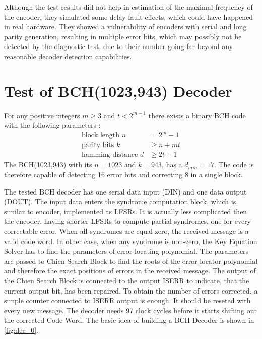 Although the test results did not help in estimation of the maximal frequency of the encoder, they simulated some delay fault effects, which could have happened in real hardware. They showed a vulnerability of encoders with serial and long parity generation, resulting in multiple error bits, which may possibly not be detected by the diagnostic test, due to their number going far beyond any reasonable decoder detection capabilities.

\section{Test of BCH(1023,943) Decoder}
For any positive integers $m \geq 3$ and $t<2^{m-1}$ there exists a binary BCH code with the following parameters \cite{art:BCH_implement}:
\begin{subequations}
\begin{align}
    \text{block length }n&=2^{m}-1\label{eq:blck_len}\\
    \text{parity bits }k&\geq n+mt\label{eq:parity}\\
    \text{hamming distance }d&\geq2t+1\label{eq:dmin}
\end{align}
\end{subequations}
The BCH(1023,943) with its $n = 1023$ and $k=943$, has a $d_{min}= 17$. The code is therefore capable of detecting 16 error bits and correcting 8 in a single block. 

The tested BCH decoder has one serial data input (DIN) and one data output (DOUT). The input data enters the syndrome computation block, which is, similar to encoder, implemented as LFSRs. It is actually less complicated then the encoder, having shorter LFSRs to compute partial syndromes, one for every correctable error. When all syndromes are equal zero, the received message is a valid code word. In other case, when any syndrome is non-zero, the Key Equation Solver has to find the parameters of error locating polynomial. The parameters are passed to Chien Search Block to find the roots of the error locator polynomial and therefore the exact positions of errors in the received message. The output of the Chien Search Block is connected to the output ISERR to indicate, that the current output bit, has been repaired. To obtain the number of errors corrected, a simple counter connected to ISERR output is enough. It should be reseted with every new message. The decoder needs 97 clock cycles before it starts shifting out the corrected Code Word. The basic idea of building a BCH Decoder is shown in \autoref{fig:dec_0}.


